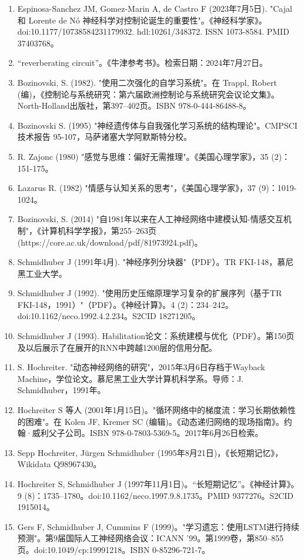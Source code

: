 \begin{enumerate}
\item Espinosa-Sanchez JM, Gomez-Marin A, de Castro F (2023年7月5日). "Cajal 和 Lorente de Nó 神经科学对控制论诞生的重要性"。《神经科学家》。doi:10.1177/10738584231179932. hdl:10261/348372. ISSN 1073-8584. PMID 37403768。
\item “reverberating circuit”。《牛津参考书》。检索日期：2024年7月27日。
\item Bozinovski, S. (1982). "使用二次强化的自学习系统"。在 Trappl, Robert (编)，《控制论与系统研究：第六届欧洲控制论与系统研究会议论文集》。North-Holland出版社，第397–402页。ISBN 978-0-444-86488-8。
\item Bozinovski S. (1995) "神经遗传体与自我强化学习系统的结构理论"。CMPSCI技术报告 95-107，马萨诸塞大学阿默斯特分校。
\item R. Zajonc (1980) "感觉与思维：偏好无需推理"。《美国心理学家》，35 (2)：151-175。
\item Lazarus R. (1982) "情感与认知关系的思考"，《美国心理学家》，37 (9)：1019-1024。
\item Bozinovski, S. (2014) "自1981年以来在人工神经网络中建模认知-情感交互机制"，《计算机科学学报》，第255–263页 (https://core.ac.uk/download/pdf/81973924.pdf)。
\item Schmidhuber J (1991年4月). "神经序列分块器"（PDF）。TR FKI-148，慕尼黑工业大学。
\item Schmidhuber J (1992). "使用历史压缩原理学习复杂的扩展序列（基于TR FKI-148，1991）"（PDF）。《神经计算》。4 (2)：234–242。doi:10.1162/neco.1992.4.2.234。S2CID 18271205。
\item Schmidhuber J (1993). Habilitation论文：系统建模与优化（PDF）。第150页及以后展示了在展开的RNN中跨越1200层的信用分配。
\item S. Hochreiter. "动态神经网络的研究"，2015年3月6日存档于Wayback Machine，学位论文。慕尼黑工业大学计算机科学系。导师：J. Schmidhuber，1991年。
\item Hochreiter S 等人 (2001年1月15日)。"循环网络中的梯度流：学习长期依赖性的困难"。在 Kolen JF, Kremer SC (编辑)。《动态递归网络的现场指南》。约翰·威利父子公司。ISBN 978-0-7803-5369-5。2017年6月26日检索。
\item Sepp Hochreiter, Jürgen Schmidhuber (1995年8月21日)，《长短期记忆》，Wikidata Q98967430。
\item Hochreiter S, Schmidhuber J (1997年11月1日)。“长短期记忆”。《神经计算》。9 (8)：1735–1780。doi:10.1162/neco.1997.9.8.1735。PMID 9377276。S2CID 1915014。
\item Gers F, Schmidhuber J, Cummins F (1999)。"学习遗忘：使用LSTM进行持续预测"。第9届国际人工神经网络会议：ICANN '99。第1999卷，第850–855页。doi:10.1049/cp:19991218。ISBN 0-85296-721-7。

\end{enumerate}
